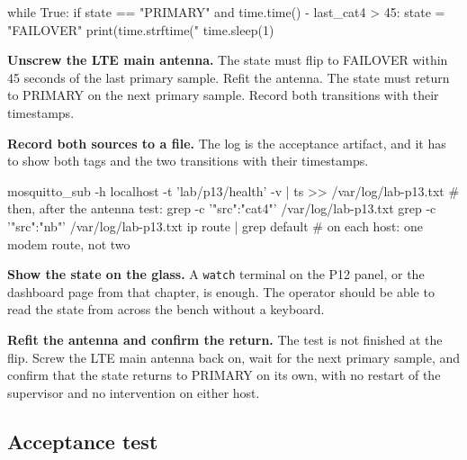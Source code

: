 \begin{steps}
\begin{pycode}
while True:
    if state == "PRIMARY" and time.time() - last_cat4 > 45:
        state = "FAILOVER"
        print(time.strftime("%
    time.sleep(1)
\end{pycode}

\item \textbf{Unscrew the LTE main antenna.} The state must flip to FAILOVER within 45 seconds of the last primary sample. Refit the antenna. The state must return to PRIMARY on the next primary sample. Record both transitions with their timestamps.

\item \textbf{Record both sources to a file.} The log is the acceptance artifact, and it has to show both tags and the two transitions with their timestamps.
\begin{shellcode}
mosquitto_sub -h localhost -t 'lab/p13/health' -v | ts >> /var/log/lab-p13.txt
# then, after the antenna test:
grep -c '"src":"cat4"' /var/log/lab-p13.txt
grep -c '"src":"nb"'   /var/log/lab-p13.txt
ip route | grep default        # on each host: one modem route, not two
\end{shellcode}

\item \textbf{Show the state on the glass.} A \texttt{watch} terminal on the P12 panel, or the dashboard page from that chapter, is enough. The operator should be able to read the state from across the bench without a keyboard.

\item \textbf{Refit the antenna and confirm the return.} The test is not finished at the flip. Screw the LTE main antenna back on, wait for the next primary sample, and confirm that the state returns to PRIMARY on its own, with no restart of the supervisor and no intervention on either host.
\end{steps}

\subsection*{Acceptance test}

